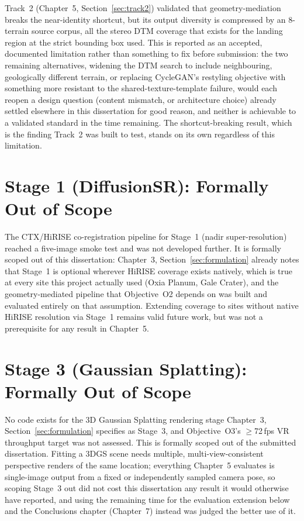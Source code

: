 Track~2 (Chapter~5, Section~\ref{sec:track2}) validated that geometry-mediation breaks the near-identity shortcut, but its output diversity is compressed by an 8-terrain source corpus, all the stereo DTM coverage that exists for the landing region at the strict bounding box used. This is reported as an accepted, documented limitation rather than something to fix before submission: the two remaining alternatives, widening the DTM search to include neighbouring, geologically different terrain, or replacing CycleGAN's restyling objective with something more resistant to the shared-texture-template failure, would each reopen a design question (content mismatch, or architecture choice) already settled elsewhere in this dissertation for good reason, and neither is achievable to a validated standard in the time remaining. The shortcut-breaking result, which is the finding Track~2 was built to test, stands on its own regardless of this limitation.

\section{Stage 1 (DiffusionSR): Formally Out of Scope}
\label{sec:diffusionsr-decision}

The CTX/HiRISE co-registration pipeline for Stage~1 (nadir super-resolution) reached a five-image smoke test and was not developed further. It is formally scoped out of this dissertation: Chapter~3, Section~\ref{sec:formulation} already notes that Stage~1 is optional wherever HiRISE coverage exists natively, which is true at every site this project actually used (Oxia Planum, Gale Crater), and the geometry-mediated pipeline that Objective~O2 depends on was built and evaluated entirely on that assumption. Extending coverage to sites without native HiRISE resolution via Stage~1 remains valid future work, but was not a prerequisite for any result in Chapter~5.

\section{Stage 3 (Gaussian Splatting): Formally Out of Scope}
\label{sec:gs-decision}

No code exists for the 3D Gaussian Splatting rendering stage Chapter~3, Section~\ref{sec:formulation} specifies as Stage~3, and Objective~O3's $\geq$72\,fps VR throughput target was not assessed. This is formally scoped out of the submitted dissertation. Fitting a 3DGS scene needs multiple, multi-view-consistent perspective renders of the same location; everything Chapter~5 evaluates is single-image output from a fixed or independently sampled camera pose, so scoping Stage~3 out did not cost this dissertation any result it would otherwise have reported, and using the remaining time for the evaluation extension below and the Conclusions chapter (Chapter~7) instead was judged the better use of it.

